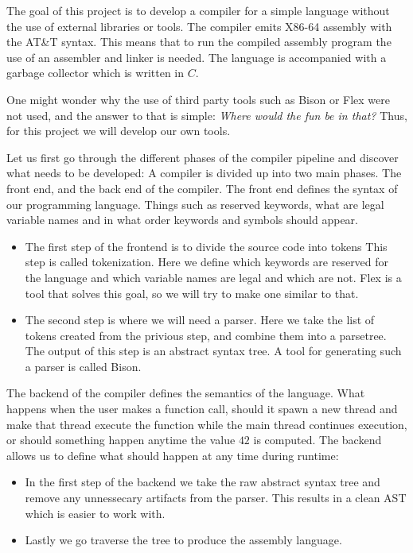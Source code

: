 The goal of this project is to develop a compiler for a simple language without the use of external libraries or tools. The compiler emits X86-64 assembly with the AT\&T syntax. This means that to run the compiled assembly program the use of an assembler and linker is needed. The language is accompanied with a garbage collector which is written in $C$. 

One might wonder why the use of third party tools such as Bison or Flex were not used, and the answer to that is simple: \textit{Where would the fun be in that?} Thus, for this project we will develop our own tools. 

Let us first go through the different phases of the compiler pipeline and discover what needs to be developed:
A compiler is divided up into two main phases. The front end, and the back end of the compiler. The front end defines the syntax of our programming language. Things such as reserved keywords, what are legal variable names and in what order keywords and symbols should appear. 
\begin{itemize}
    \item The first step of the frontend is to divide the source code into tokens This step is called tokenization. Here we define which keywords are reserved for the language and which variable names are legal and which are not. Flex is a tool that solves this goal, so we will try to make one similar to that.
    \item The second step is where we will need a parser. Here we take the list of tokens created from the privious step, and combine them into a parsetree. The output of this step is an abstract syntax tree. A tool for generating such a parser is called Bison.
\end{itemize}  

The backend of the compiler defines the semantics of the language. What happens when the user makes a function call, should it spawn a new thread and make that thread execute the function while the main thread continues execution, or should something happen anytime the value $42$ is computed. The backend allows us to define what should happen at any time during runtime:
\begin{itemize}
  \item In the first step of the backend we take the raw abstract syntax tree and remove any unnessecary artifacts from the parser. This results in a clean AST which is easier to work with.
  \item Lastly we go traverse the tree to produce the assembly language.
\end{itemize}

